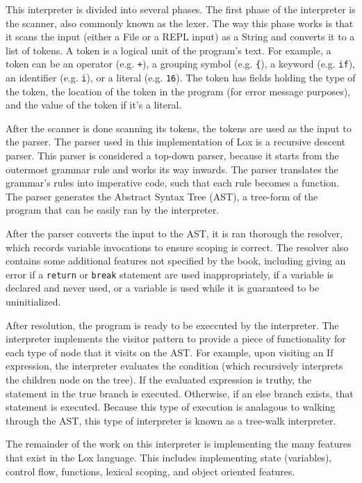 \documentclass[tikz]{article}
\renewcommand{\:}{\colon}
\begin{document}
This interpreter is divided into several phases. The first phase of the interpreter is the scanner, also commonly known as the lexer. The way this phase works is that it scans the input (either a File or a REPL input) as a String and converts it to a list of tokens. A token is a logical unit of the program's text. For example, a token can be an operator (e.g. \texttt{+}), a grouping symbol (e.g. \texttt{\{}), a keyword (e.g. \texttt{if}), an identifier (e.g. \texttt{i}), or a literal (e.g. \texttt{16}). The token has fields holding the type of the token, the location of the token in the program (for error message purposes), and the value of the token if it's a literal.

After the scanner is done scanning its tokens, the tokens are used as the input to the parser. The parser used in this implementation of Lox is a recursive descent parser. This parser is considered a top-down parser, because it starts from the outermost grammar rule and works its way inwards. The parser translates the grammar's rules into imperative code, such that each rule becomes a function. The parser generates the Abstract Syntax Tree (AST), a tree-form of the program that can be easily ran by the interpreter.

After the parser converts the input to the AST, it is ran thorough the resolver, which records variable invocations to ensure scoping is correct. The resolver also contains some additional features not specified by the book, including giving an error if a \texttt{return} or \texttt{break} statement are used inappropriately, if a variable is declared and never used, or a variable is used while it is guaranteed to be uninitialized.

After resolution, the program is ready to be execcuted by the interpreter. The interpreter implements the visitor pattern to provide a piece of functionality for each type of node that it visits on the AST. For example, upon visiting an If expression, the interpreter evaluates the condition (which recursively interprets the children node on the tree). If the evaluated expression is truthy, the statement in the true branch is executed. Otherwise, if an else branch exists, that statement is executed. Because this type of execution is analagous to walking through the AST, this type of interpreter is known as a tree-walk interpreter.

The remainder of the work on this interpreter is implementing the many features that exist in the Lox language. This includes implementing state (variables), control flow, functions, lexical scoping, and object oriented features.
\end{document}
